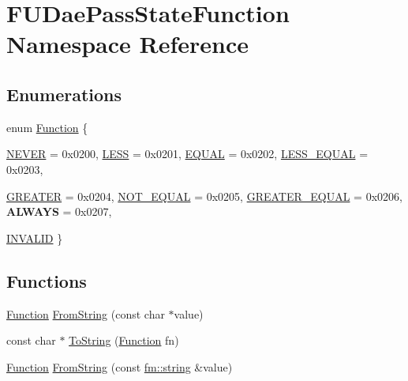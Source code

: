 \hypertarget{namespaceFUDaePassStateFunction}{
\section{FUDaePassStateFunction Namespace Reference}
\label{namespaceFUDaePassStateFunction}
}
\subsection*{Enumerations}
\begin{DoxyCompactItemize}
\item 
enum \hyperlink{namespaceFUDaePassStateFunction_af0f6fbb32c14e5a19559a6630f783313}{Function} \{ \par
\hyperlink{namespaceFUDaePassStateFunction_af0f6fbb32c14e5a19559a6630f783313a25add4ac74e3d5be8370ee5298f4f36a}{NEVER} =  0x0200, 
\hyperlink{namespaceFUDaePassStateFunction_af0f6fbb32c14e5a19559a6630f783313a89d0b0ffd1191e29a417a21a70e19bac}{LESS} =  0x0201, 
\hyperlink{namespaceFUDaePassStateFunction_af0f6fbb32c14e5a19559a6630f783313a5d6ea748eaf31f9a5f34eb67dd9ae804}{EQUAL} =  0x0202, 
\hyperlink{namespaceFUDaePassStateFunction_af0f6fbb32c14e5a19559a6630f783313a358867e7516e0ce77740d58126ac5129}{LESS\_\-EQUAL} =  0x0203, 
\par
\hyperlink{namespaceFUDaePassStateFunction_af0f6fbb32c14e5a19559a6630f783313a431c00a8fd2da9ed7af950b7e017dc67}{GREATER} =  0x0204, 
\hyperlink{namespaceFUDaePassStateFunction_af0f6fbb32c14e5a19559a6630f783313ae5f080a885afaeb1c502d940a413ba4f}{NOT\_\-EQUAL} =  0x0205, 
\hyperlink{namespaceFUDaePassStateFunction_af0f6fbb32c14e5a19559a6630f783313af6addbfd959ff6654f18bdcfb54c4fb8}{GREATER\_\-EQUAL} =  0x0206, 
{\bfseries ALWAYS} =  0x0207, 
\par
\hyperlink{namespaceFUDaePassStateFunction_af0f6fbb32c14e5a19559a6630f783313a83282fb0c2b2de5fe9814c8bba01aed8}{INVALID}
 \}
\end{DoxyCompactItemize}
\subsection*{Functions}
\begin{DoxyCompactItemize}
\item 
\hyperlink{namespaceFUDaePassStateFunction_af0f6fbb32c14e5a19559a6630f783313}{Function} \hyperlink{namespaceFUDaePassStateFunction_a1ecd500a9e8d0be82e0415c2f0e8047d}{FromString} (const char $\ast$value)
\item 
const char $\ast$ \hyperlink{namespaceFUDaePassStateFunction_a779cb89b2e35a4f2ab53a669212f41a9}{ToString} (\hyperlink{namespaceFUDaePassStateFunction_af0f6fbb32c14e5a19559a6630f783313}{Function} fn)
\item 
\hyperlink{namespaceFUDaePassStateFunction_af0f6fbb32c14e5a19559a6630f783313}{Function} \hyperlink{namespaceFUDaePassStateFunction_a6d06e1464f66d48fbe15da048e1594c9}{FromString} (const \hyperlink{classfm_1_1stringT}{fm::string} \&value)
\end{DoxyCompactItemize}


